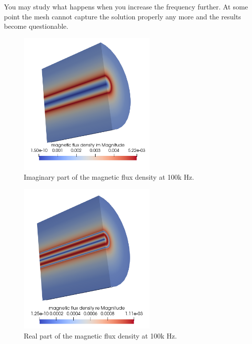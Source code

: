 You may study what happens when you increase the frequency further. At some point the mesh cannot capture the solution
properly any more and the results become questionable.

\begin{figure}[H]
\centering
\includegraphics[width=0.6\textwidth]{mag-flux-dens-im-100k}
\caption{Imaginary part of the magnetic flux density at 100k Hz.}
\label{fg:BfieldWire-im}
\end{figure}  

\begin{figure}[H]
\centering
\includegraphics[width=0.6\textwidth]{mag-flux-dens-re-100k}
\caption{Real part of the magnetic flux density at 100k Hz.}
\label{fg:BfieldWire-re}
\end{figure}  

